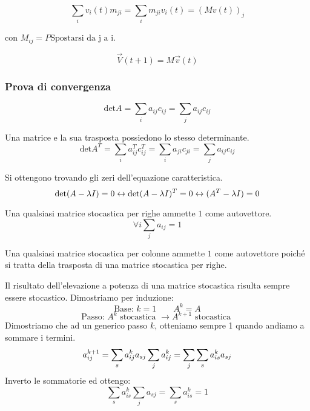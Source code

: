 \documentclass[\main/main.tex]{subfiles}
\begin{document}
\[
	\sum_i v_i(t) m_{ji} = \sum_i m_{ji}v_i(t) = (Mv(t))_j
\]

con $M_{ij} = P \text{Spostarsi da j a i}$.

\[
	\vec{V}(t+1) = M\vec{v}(t)
\]

\subsubsection{Prova di convergenza}

\begin{definition}[Determinante]
	\[
		\text{det}A = \sum_i a_{ij} c_{ij} = \sum_j a_{ij} c_{ij}	
	\]
\end{definition}

\begin{definition}
Una matrice e la sua trasposta possiedono lo stesso determinante.
	\[
		\text{det}A^T = \sum_i a^T_{ij} c^T_{ij} = \sum_i a_{ji} c_{ji}	 =  \sum_j a_{ij} c_{ij}	
	\]
\end{definition}

\begin{definition}[Autovalori]
Si ottengono trovando gli zeri dell'equazione caratteristica.
\[
	\text{det}(A-\lambda I) = 0 \leftrightarrow \text{det}(A-\lambda I)^T = 0 \leftrightarrow  \text(A^T-\lambda I) = 0
\]
\end{definition}

\begin{definition}
Una qualsiasi matrice stocastica per righe ammette $1$ come autovettore.
\[
	\forall i \sum_j a_{ij} = 1
\]
\end{definition}

\begin{definition}
Una qualsiasi matrice stocastica per colonne ammette $1$ come autovettore poiché si tratta della trasposta di una matrice stocastica per righe.
\end{definition}

\begin{theorem}
Il risultato dell'elevazione a potenza di una matrice stocastica risulta sempre essere stocastico. Dimostriamo per induzione:
\[
	\text{Base: } k=1 \qquad A^k = A
\] 
\[
	\text{Passo: } A^k \text{ stocastica } \rightarrow A^{k+1} \text{ stocastica }
\]
Dimostriamo che ad un generico passo $k$, otteniamo sempre 1 quando andiamo a sommare i termini.
\[
	a_{ij}^{k+1} = \sum_s a^k_{ij} a_{sj}\\
	\sum_j a^k_{ij} = \sum_j \sum_s a^k_{is}a_{sj}
\] 
Inverto le sommatorie ed ottengo:
\[
	\sum_s a_{is}^k \sum_j a_{sj} = \sum_s a^k_{is} = 1
\]
\end{theorem}
\end{document}
